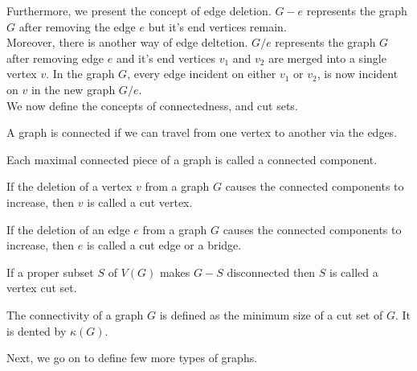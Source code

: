 \documentclass[../basic_graph_theory.tex]{subfiles}
\begin{document}
Furthermore, we present the concept of edge deletion. $G-e$ represents the graph $G$ after removing the edge $e$ but it's end vertices remain.\\

Moreover, there is another way of edge deltetion. $G/e$ represents the graph $G$ after removing edge $e$ and it's end vertices $v_1$ and $v_2$ are merged into a single vertex $v$. In the graph $G$, every edge incident on either $v_1$ or $v_2$, is now incident on $v$ in the new graph $G/e$.\\

We now define the concepts of connectedness, and cut sets.\\
\begin{defn}
    A graph is connected if we can travel from one vertex to another via the edges.
\end{defn}

\begin{defn}
    Each maximal connected piece of a graph is called a connected component.
\end{defn}

\begin{defn}
    If the deletion of a vertex $v$ from a graph $G$ causes the connected components to increase, then $v$ is called a cut vertex.
\end{defn}

\begin{defn}
    If the deletion of an edge $e$ from a graph $G$ causes the connected components to increase, then $e$ is called a cut edge or a bridge.
\end{defn}

\begin{defn}
    If a proper subset $S$ of $V(G)$ makes $G-S$ disconnected then $S$ is called a vertex cut set.
\end{defn}

\begin{defn}
    The connectivity of a graph $G$ is defined as the minimum size of a cut set of $G$. It is dented by $\kappa(G)$.
\end{defn}

Next, we go on to define few more types of graphs.
\end{document}
